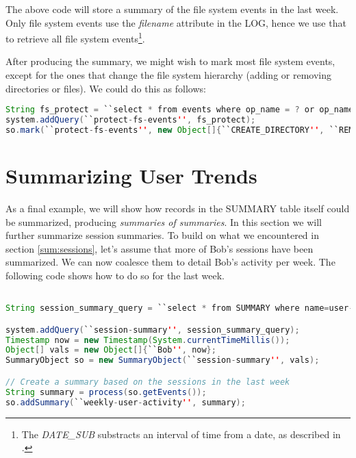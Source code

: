 \noindent
The above code will store a summary of the file system events in the last week. Only file system events use the \emph{filename} attribute in the LOG, hence we use that to retrieve all file system events\footnote{The \emph{DATE\_SUB} substracts an interval of time from a date, as described in \cite{pgsql-gen}.}.

After producing the summary, we might wish to mark most file system events, except for the ones that change the file system hierarchy (adding or removing directories or files). We could do this as follows:

\begin{lstlisting}[language=Java]
String fs_protect = ``select * from events where op_name = ? or op_name = ?''
system.addQuery(``protect-fs-events'', fs_protect);
so.mark(``protect-fs-events'', new Object[]{``CREATE_DIRECTORY'', ``REMOVE_DIRECTORY'', ``CREATE_FILE, ``REMOVE_FILE''});
\end{lstlisting}

\section{Summarizing User Trends}

As a final example, we will show how records in the SUMMARY table itself could be summarized, producing \emph{summaries of summaries}. In this section we will further summarize session summaries. To build on what we encountered in section \ref{sum:sessions}, let's assume that more of Bob's sessions have been summarized. We can now coalesce them to detail Bob's activity per week. The following code shows how to do so for the last week.

\begin{lstlisting}[language=Java]

String session_summary_query = ``select * from SUMMARY where name=user-session-summary and to_array(args)[0]=? to_array(args)[3]::timestamp > DATE_SUB(?, INTERVAL 7 DAY) and to_array(args)[3]::timestamp < DATE_SUB(?, INTERVAL 14 DAY)';

system.addQuery(``session-summary'', session_summary_query);
Timestamp now = new Timestamp(System.currentTimeMillis());
Object[] vals = new Object[]{``Bob'', now};
SummaryObject so = new SummaryObject(``session-summary'', vals);

// Create a summary based on the sessions in the last week
String summary = process(so.getEvents());
so.addSummary(``weekly-user-activity'', summary);
\end{lstlisting}


